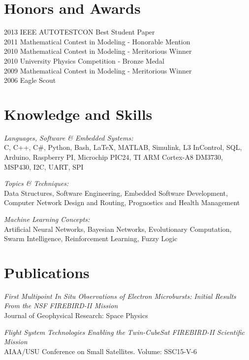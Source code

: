 \documentclass[line,margin]{res}
\begin{document}
\begin{resume}
\clearpage

\section{Honors and Awards}           
			2013 IEEE AUTOTESTCON Best Student Paper \\  
			2011 Mathematical Contest in Modeling - Honorable Mention \\
            2010 Mathematical Contest in Modeling - Meritorious Winner \\
            2010 University Physics Competition - Bronze Medal \\
			2009 Mathematical Contest in Modeling - Meritorious Winner \\
            2006 Eagle Scout
            
\section{Knowledge and Skills} {\sl Languages, Software \& Embedded Systems:}\\
				C, C++, C\#, Python, Bash, \LaTeX, MATLAB, Simulink, L3 InControl, SQL, Arduino, Raspberry PI, Microchip PIC24, TI ARM Cortex-A8 DM3730, MSP430, I2C, UART, SPI
                
                {\sl Topics \& Techniques:}\\Data Structures, Software Engineering, Embedded Software Development, Computer Network Design and Routing, Prognostics and Health Management
                
                {\sl Machine Learning Concepts:}\\Artificial Neural Networks, Bayesian Networks, Evolutionary Computation, Swarm Intelligence, Reinforcement Learning, Fuzzy Logic
			
\section{Publications} 
{\sl First Multipoint In Situ Observations of Electron Microbursts: Initial Results From the NSF FIREBIRD-II Mission}\\
Journal of Geophysical Research: Space Physics

{\sl Flight System Technologies Enabling the Twin-CubeSat FIREBIRD-II Scientific Mission}\\
AIAA/USU Conference on Small Satellites. Volume: SSC15-V-6 


\end{resume}
\end{document}
